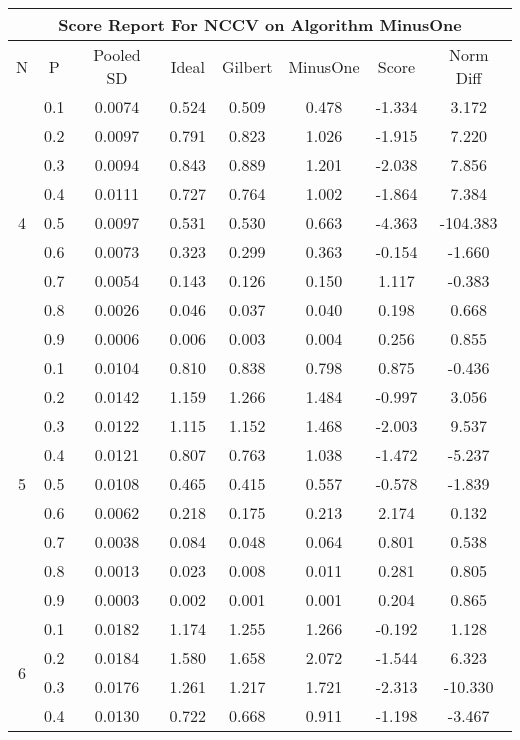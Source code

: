 \documentclass[11pt,a4paper]{report}
\begin{document}
\begin{longtable}{ | c | c || c | c | c | c | c | c | }
\hline
\multicolumn{8}{|c|}{ Score Report For NCCV on Algorithm MinusOne} \\
\hline
N & P & Pooled SD &  Ideal &  Gilbert & MinusOne  & Score & Norm Diff \\
 \hline
 \hline
 \endhead
\multirow{9}{*}{4} & 0.1 & 0.0074 & 0.524 & 0.509 & 0.478 & -1.334 & 3.172 \\
 & 0.2 & 0.0097 & 0.791 & 0.823 & 1.026 & -1.915 & 7.220 \\
 & 0.3 & 0.0094 & 0.843 & 0.889 & 1.201 & -2.038 & 7.856 \\
 & 0.4 & 0.0111 & 0.727 & 0.764 & 1.002 & -1.864 & 7.384 \\
 & 0.5 & 0.0097 & 0.531 & 0.530 & 0.663 & -4.363 & -104.383 \\
 & 0.6 & 0.0073 & 0.323 & 0.299 & 0.363 & -0.154 & -1.660 \\
 & 0.7 & 0.0054 & 0.143 & 0.126 & 0.150 & 1.117 & -0.383 \\
 & 0.8 & 0.0026 & 0.046 & 0.037 & 0.040 & 0.198 & 0.668 \\
 & 0.9 & 0.0006 & 0.006 & 0.003 & 0.004 & 0.256 & 0.855 \\
 \hline
\multirow{9}{*}{5} & 0.1 & 0.0104 & 0.810 & 0.838 & 0.798 & 0.875 & -0.436 \\
 & 0.2 & 0.0142 & 1.159 & 1.266 & 1.484 & -0.997 & 3.056 \\
 & 0.3 & 0.0122 & 1.115 & 1.152 & 1.468 & -2.003 & 9.537 \\
 & 0.4 & 0.0121 & 0.807 & 0.763 & 1.038 & -1.472 & -5.237 \\
 & 0.5 & 0.0108 & 0.465 & 0.415 & 0.557 & -0.578 & -1.839 \\
 & 0.6 & 0.0062 & 0.218 & 0.175 & 0.213 & 2.174 & 0.132 \\
 & 0.7 & 0.0038 & 0.084 & 0.048 & 0.064 & 0.801 & 0.538 \\
 & 0.8 & 0.0013 & 0.023 & 0.008 & 0.011 & 0.281 & 0.805 \\
 & 0.9 & 0.0003 & 0.002 & 0.001 & 0.001 & 0.204 & 0.865 \\
 \hline
\multirow{9}{*}{6} & 0.1 & 0.0182 & 1.174 & 1.255 & 1.266 & -0.192 & 1.128 \\
 & 0.2 & 0.0184 & 1.580 & 1.658 & 2.072 & -1.544 & 6.323 \\
 & 0.3 & 0.0176 & 1.261 & 1.217 & 1.721 & -2.313 & -10.330 \\
 & 0.4 & 0.0130 & 0.722 & 0.668 & 0.911 & -1.198 & -3.467 \\

\end{longtable}
\end{document}

